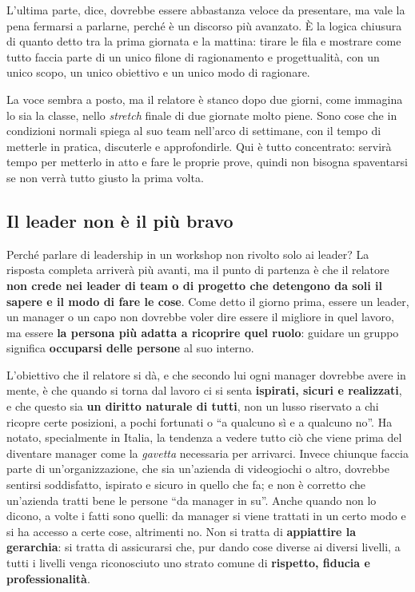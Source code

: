 L'ultima parte, dice, dovrebbe essere abbastanza veloce da presentare, ma vale la pena
fermarsi a parlarne, perché è un discorso più avanzato. È la logica chiusura di quanto
detto tra la prima giornata e la mattina: tirare le fila e mostrare come tutto faccia parte
di un unico filone di ragionamento e progettualità, con un unico scopo, un unico obiettivo e
un unico modo di ragionare.

La voce sembra a posto, ma il relatore è stanco dopo due giorni, come immagina lo sia la
classe, nello \emph{stretch} finale di due giornate molto piene. Sono cose che in condizioni
normali spiega al suo team nell'arco di settimane, con il tempo di metterle in pratica,
discuterle e approfondirle. Qui è tutto concentrato: servirà tempo per metterlo in atto e
fare le proprie prove, quindi non bisogna spaventarsi se non verrà tutto giusto la prima
volta.

\subsection{Il leader non è il più bravo}

Perché parlare di leadership in un workshop non rivolto solo ai leader? La risposta
completa arriverà più avanti, ma il punto di partenza è che il relatore \textbf{non crede
nei leader di team o di progetto che detengono da soli il sapere e il modo di fare le
cose}. Come detto il giorno prima, essere un leader, un manager o un capo non dovrebbe
voler dire essere il migliore in quel lavoro, ma essere \textbf{la persona più adatta a
ricoprire quel ruolo}: guidare un gruppo significa \textbf{occuparsi delle persone} al suo
interno.

L'obiettivo che il relatore si dà, e che secondo lui ogni manager dovrebbe avere in mente,
è che quando si torna dal lavoro ci si senta \textbf{ispirati, sicuri e realizzati}, e che
questo sia \textbf{un diritto naturale di tutti}, non un lusso riservato a chi ricopre certe
posizioni, a pochi fortunati o ``a qualcuno sì e a qualcuno no''. Ha notato,
specialmente in Italia, la tendenza a vedere tutto ciò che viene prima del diventare
manager come la \emph{gavetta} necessaria per arrivarci. Invece chiunque faccia parte di
un'organizzazione, che sia un'azienda di videogiochi o altro, dovrebbe sentirsi soddisfatto,
ispirato e sicuro in quello che fa; e non è corretto che un'azienda tratti bene le persone
``da manager in su''. Anche quando non lo dicono, a volte i fatti sono quelli: da manager si
viene trattati in un certo modo e si ha accesso a certe cose, altrimenti no. Non si tratta di
\textbf{appiattire la gerarchia}: si tratta di assicurarsi che, pur dando cose diverse ai
diversi livelli, a tutti i livelli venga riconosciuto uno strato comune di
\textbf{rispetto, fiducia e professionalità}.

